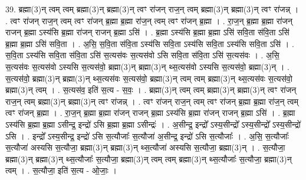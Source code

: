 \documentclass[17pt]{extarticle}
\begin{document}
39. ब्रह्मा(3)न् त्वम् त्वम् ब्रह्मा(3)न् ब्रह्मा(3)न् त्वꣳ रा॑जन् राज॒न् त्वम् ब्रह्मा(3)न् ब्रह्मा(3)न् त्वꣳ रा॑जन्न् । . त्वꣳ रा॑जन् राज॒न् त्वम् त्वꣳ रा॑जन् ब्र॒ह्मा ब्र॒ह्मा रा॑ज॒न् त्वम् त्वꣳ रा॑जन् ब्र॒ह्मा । . रा॒ज॒न् ब्र॒ह्मा ब्र॒ह्मा रा॑जन् राजन् ब्र॒ह्मा ऽस्य॑सि ब्र॒ह्मा रा॑जन् राजन् ब्र॒ह्मा ऽसि॑ । . ब्र॒ह्मा ऽस्य॑सि ब्र॒ह्मा ब्र॒ह्मा ऽसि॑ सवि॒ता स॑वि॒ता ऽसि॑ ब्र॒ह्मा ब्र॒ह्मा ऽसि॑ सवि॒ता । . अ॒सि॒ स॒वि॒ता स॑वि॒ता ऽस्य॑सि सवि॒ता ऽस्य॑सि सवि॒ता ऽस्य॑सि सवि॒ता ऽसि॑ । . स॒वि॒ता ऽस्य॑सि सवि॒ता स॑वि॒ता ऽसि॑ स॒त्यस॑वः स॒त्यस॑वो ऽसि सवि॒ता स॑वि॒ता ऽसि॑ स॒त्यस॑वः । . अ॒सि॒ स॒त्यस॑वः स॒त्यस॑वो ऽस्यसि स॒त्यस॑वो॒ ब्रह्मा(3)न् ब्रह्मा(3)न् थ्स॒त्यस॑वो ऽस्यसि स॒त्यस॑वो॒ ब्रह्मा(3)न् । . स॒त्यस॑वो॒ ब्रह्मा(3)न् ब्रह्मा(3)न् थ्स॒त्यस॑वः स॒त्यस॑वो॒ ब्रह्मा(3)न् त्वम् त्वम् ब्रह्मा(3)न् थ्स॒त्यस॑वः स॒त्यस॑वो॒ ब्रह्मा(3)न् त्वम् । . स॒त्यस॑व॒ इति॑ स॒त्य - स॒वः॒ । . ब्रह्मा(3)न् त्वम् त्वम् ब्रह्मा(3)न् ब्रह्मा(3)न् त्वꣳ रा॑जन् राज॒न् त्वम् ब्रह्मा(3)न् ब्रह्मा(3)न् त्वꣳ रा॑जन्न् । . त्वꣳ रा॑जन् राज॒न् त्वम् त्वꣳ रा॑जन् ब्र॒ह्मा ब्र॒ह्मा रा॑ज॒न् त्वम् त्वꣳ रा॑जन् ब्र॒ह्मा । . रा॒ज॒न् ब्र॒ह्मा ब्र॒ह्मा रा॑जन् राजन् ब्र॒ह्मा ऽस्य॑सि ब्र॒ह्मा रा॑जन् राजन् ब्र॒ह्मा ऽसि॑ । . ब्र॒ह्मा ऽस्य॑सि ब्र॒ह्मा ब्र॒ह्मा ऽसीन्द्र॒ इन्द्रो॑ ऽसि ब्र॒ह्मा ब्र॒ह्मा ऽसीन्द्रः॑ । . अ॒सीन्द्र॒ इन्द्रो᳚ ऽस्य॒सीन्द्रो᳚ ऽस्य॒सीन्द्रो᳚ ऽस्य॒सीन्द्रो॑ ऽसि । . इन्द्रो᳚ ऽस्य॒सीन्द्र॒ इन्द्रो॑ ऽसि स॒त्यौजाः᳚ स॒त्यौजा॑ अ॒सीन्द्र॒ इन्द्रो॑ ऽसि स॒त्यौजाः᳚ । . अ॒सि॒ स॒त्यौजाः᳚ स॒त्यौजा॑ अस्यसि स॒त्यौजा॒ ब्रह्मा(3)न् ब्रह्मा(3)न् थ्स॒त्यौजा॑ अस्यसि स॒त्यौजा॒ ब्रह्मा(3)न् । . स॒त्यौजा॒ ब्रह्मा(3)न् ब्रह्मा(3)न् थ्स॒त्यौजाः᳚ स॒त्यौजा॒ ब्रह्मा(3)न् त्वम् त्वम् ब्रह्मा(3)न् थ्स॒त्यौजाः᳚ स॒त्यौजा॒ ब्रह्मा(3)न् त्वम् । . स॒त्यौजा॒ इति॑ स॒त्य - ओ॒जाः॒ । \newline
\pagebreak
{}
\end{document}
